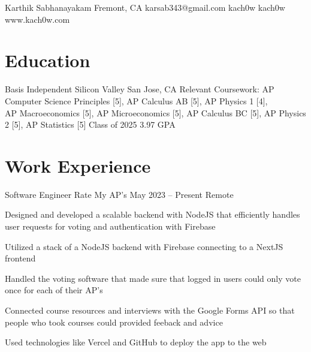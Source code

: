 \documentclass[letterpaper]{resume_config}
\begin{document}
\Header
    {Karthik Sabhanayakam} %
    {Fremont, CA} %
    {karsab343@gmail.com} %
    {kach0w} %
    {kach0w} %
    {www.kach0w.com} %

\section{Education}

\EducationExperience
    {Basis Independent Silicon Valley} %
    {San Jose, CA}
    {Relevant Coursework: AP Computer Science Principles [5], AP Calculus AB [5], AP Physics 1 [4], \\AP Macroeconomics [5], AP Microeconomics [5], AP Calculus BC [5], AP Physics 2 [5], AP Statistics [5]} %
    {Class of 2025} %
    {3.97 GPA} %
    \vspace{4pt}
\vspace{-14pt}


\section{Work Experience}

\WorkExperience
    {Software Engineer} %
    {Rate My AP's} %
    {May 2023 -- Present} %
    {Remote} %
    {
        \item Designed and developed a scalable backend with NodeJS that efficiently handles user requests for voting and authentication with Firebase
        \item Utilized a stack of a NodeJS backend with Firebase connecting to a NextJS frontend
        \item Handled the voting software that made sure that logged in users could only vote once for each of their AP's
        \item Connected course resources and interviews with the Google Forms API so that people who took courses could provided feeback and advice
        \item Used technologies like Vercel and GitHub to deploy the app to the web
    }
\end{document}
